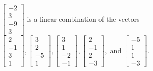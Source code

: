\begin{exercise}
\begin{exerciseStatement}
  \end{exerciseStatement}
  \begin{exerciseAnswer}
   \(\left[\begin{array}{c}
-2 \\
3 \\
-9 \\
3
\end{array}\right]\) 
  	 is  
	a linear combination of the vectors \(\left[\begin{array}{c}
2 \\
-1 \\
3 \\
1
\end{array}\right] , \left[\begin{array}{c}
3 \\
2 \\
-5 \\
1
\end{array}\right] , \left[\begin{array}{c}
3 \\
1 \\
-2 \\
-1
\end{array}\right] , \left[\begin{array}{c}
2 \\
-1 \\
2 \\
-3
\end{array}\right] , \text{ and } \left[\begin{array}{c}
-5 \\
1 \\
1 \\
-3
\end{array}\right]\).

	
  


  \end{exerciseAnswer}
\end{exercise}